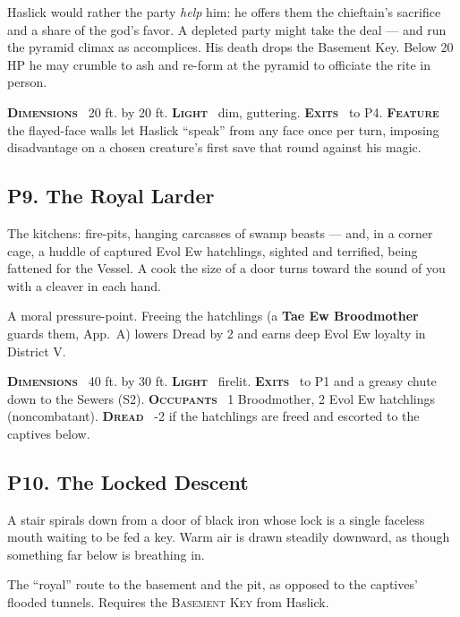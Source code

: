 \documentclass[10pt,twoside]{article}
\newcommand{\tech}[1]{\textbf{\scshape\textcolor{stone}{#1}}\ }
\newcommand{\eqname}[1]{\textsc{#1}}
\begin{document}
\begin{dmnote}
Haslick would rather the party \emph{help} him: he offers them the chieftain's
sacrifice and a share of the god's favor. A depleted party might take the deal ---
and run the pyramid climax as accomplices. His death drops the Basement Key. Below
20 HP he may crumble to ash and re-form at the pyramid to officiate the rite in
person.
\end{dmnote}

\begin{techbox}
\tech{Dimensions} 20 ft. by 20 ft. \tech{Light} dim, guttering. \tech{Exits} to P4.
\tech{Feature} the flayed-face walls let Haslick ``speak'' from any face once per
turn, imposing disadvantage on a chosen creature's first save that round against his
magic.
\end{techbox}

\subsection{P9. The Royal Larder}
\begin{readaloud}
The kitchens: fire-pits, hanging carcasses of swamp beasts --- and, in a corner
cage, a huddle of captured Evol Ew hatchlings, sighted and terrified, being fattened
for the Vessel. A cook the size of a door turns toward the sound of you with a
cleaver in each hand.
\end{readaloud}
A moral pressure-point. Freeing the hatchlings (a \textbf{Tae Ew Broodmother} guards
them, App.\ A) lowers Dread by 2 and earns deep Evol Ew loyalty in District V.

\begin{techbox}
\tech{Dimensions} 40 ft. by 30 ft. \tech{Light} firelit. \tech{Exits} to P1 and a
greasy chute down to the Sewers (S2). \tech{Occupants} 1 Broodmother, 2 Evol Ew
hatchlings (noncombatant). \tech{Dread} -2 if the hatchlings are freed and escorted
to the captives below.
\end{techbox}

\subsection{P10. The Locked Descent}
\begin{readaloud}
A stair spirals down from a door of black iron whose lock is a single faceless mouth
waiting to be fed a key. Warm air is drawn steadily downward, as though something far
below is breathing in.
\end{readaloud}
The ``royal'' route to the basement and the pit, as opposed to the captives' flooded
tunnels. Requires the \eqname{Basement Key} from Haslick.
\end{document}
